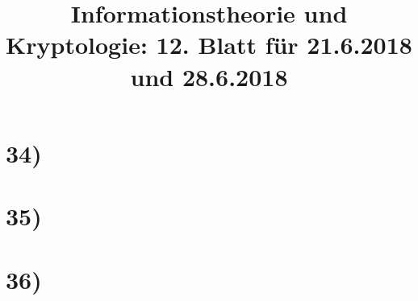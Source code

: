 %



  \title{Informationstheorie und Kryptologie: 12. Blatt für 21.6.2018 und 28.6.2018}
  \maketitle

  \section*{34)}

  \section*{35)}

  \section*{36)}


